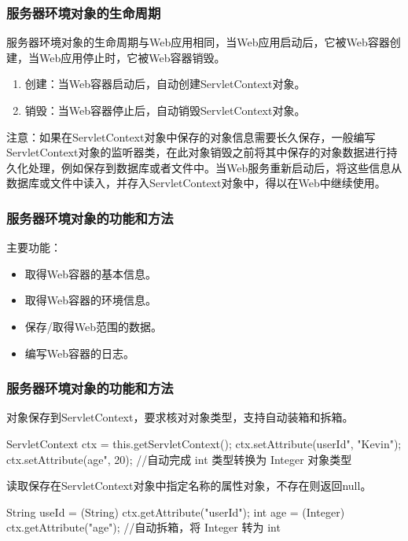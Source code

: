 \begin{frame}[fragile] %
\frametitle{服务器环境对象的生命周期} 

服务器环境对象的生命周期与Web应用相同，当Web应用启动后，它被Web容器创建，当Web应用停止时，它被Web容器销毁。

\begin{enumerate}
\item 创建：当Web容器启动后，自动创建ServletContext对象。
\item 销毁：当Web容器停止后，自动销毁ServletContext对象。
\end{enumerate}

注意：{\kai 如果在ServletContext对象中保存的对象信息需要长久保存，一般编写ServletContext对象的监听器类，在此对象销毁之前将其中保存的对象数据进行持久化处理，例如保存到数据库或者文件中。当Web服务重新启动后，将这些信息从数据库或文件中读入，并存入ServletContext对象中，得以在Web中继续使用。}

\end{frame}

\begin{frame}[fragile] %
\frametitle{服务器环境对象的功能和方法} 

主要功能：
\begin{itemize}
\item 取得Web容器的基本信息。
\item 取得Web容器的环境信息。
\item 保存/取得Web范围的数据。
\item 编写Web容器的日志。
\end{itemize}

\end{frame}

\begin{frame}[fragile] %
\frametitle{服务器环境对象的功能和方法} 



对象保存到ServletContext，要求核对对象类型，支持自动装箱和拆箱。

\begin{javaCode}
ServletContext ctx = this.getServletContext();
ctx.setAttribute(userId", "Kevin");
ctx.setAttribute(age", 20); //自动完成 int 类型转换为 Integer 对象类型
\end{javaCode}


读取保存在ServletContext对象中指定名称的属性对象，不存在则返回null。

\begin{javaCode}
String useId = (String) ctx.getAttribute("userId");
int age = (Integer) ctx.getAttribute("age"); //自动拆箱，将 Integer 转为 int
\end{javaCode}
\end{frame}

